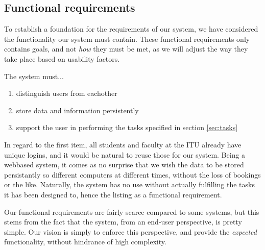 \subsection{Functional requirements}
\label{subsec:functional_requirements}
To establish a foundation for the requirements of our system, we have considered the functionality our system must contain. These functional requirements only contains goals, and not \emph{how} they must be met, as we will adjust the way they take place based on usability factors.

The system must... \begin{enumerate}
\item distinguish users from eachother
\item store data and information persistently
\item support the user in performing the tasks specified in section \ref{sec:tasks}
\end{enumerate}

In regard to the first item, all students and faculty at the ITU already have unique logins, and it would be natural to reuse those for our system. Being a webbased system, it comes as no surprise that we wish the data to be stored persistantly so different computers at different times, without the loss of bookings or the like.
Naturally, the system has no use without actually fulfilling the tasks it has been designed to, hence the listing as a functional requirement.

Our functional requirements are fairly scarce compared to some systems, but this stems from the fact that the system, from an end-user perspective, is pretty simple. Our vision is simply to enforce this perspective, and provide the \emph{expected} functionality, without hindrance of high complexity.
